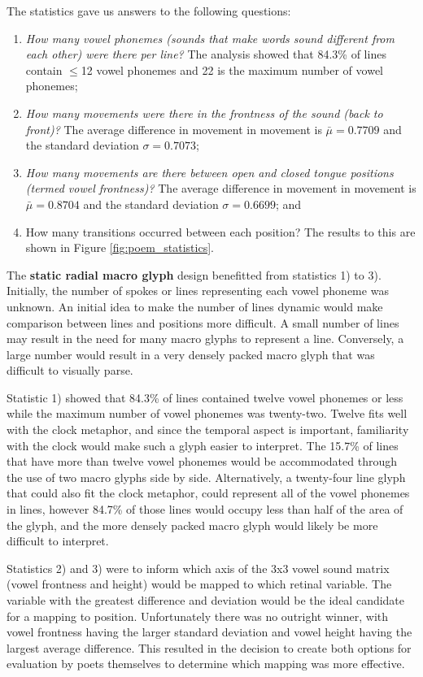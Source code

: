 The statistics gave us answers to the following questions: 
\begin{enumerate}
\item \emph{How many vowel phonemes (sounds that make words sound different from each other) were there per line?} The analysis showed that 84.3\% of lines contain $\leq$12 vowel phonemes and 22 is the maximum number of vowel phonemes;
\item \emph{How many movements were there in the frontness of the sound (back to front)?} The average difference in movement in movement is $\bar\mu=0.7709$ and the standard deviation $\sigma=0.7073$;
\item \emph{How many movements are there between open and closed tongue positions (termed vowel frontness)?} The average difference in movement in movement is $\bar\mu=0.8704$ and the standard deviation $\sigma=0.6699$; and 
\item How many transitions occurred between each position? The results to this are shown in Figure \ref{fig:poem_statistics}.
\end{enumerate}

The \textbf{static radial macro glyph} design benefitted from statistics 1) to 3). 
Initially, the number of spokes or lines representing each vowel phoneme was unknown. 
An initial idea to make the number of lines dynamic would make comparison between lines and positions more difficult. 
A small number of lines may result in the need for many macro glyphs to represent a line.
Conversely, a large number would result in a very densely packed macro glyph that was difficult to visually parse.

Statistic 1) showed that 84.3\% of lines contained twelve vowel phonemes or less while the maximum number of vowel phonemes was twenty-two. 
Twelve fits well with the clock metaphor, and since the temporal aspect is important, familiarity with the clock would make such a glyph easier to interpret. 
The 15.7\% of lines that have more than twelve vowel phonemes would be accommodated through the use of two macro glyphs side by side. 
Alternatively, a twenty-four line glyph that could also fit the clock metaphor, could represent all of the vowel phonemes in lines, however 84.7\% of those lines would occupy less than half of the area of the glyph, and the more densely packed macro glyph would likely be more difficult to interpret.

Statistics 2) and 3) were to inform which axis of the 3x3 vowel sound matrix (vowel frontness and height) would be mapped to which retinal variable. 
The variable with the greatest difference and deviation would be the ideal candidate for a mapping to position. 
Unfortunately there was no outright winner, with vowel frontness having the larger standard deviation and vowel height having the largest average difference.
This resulted in the decision to create both options for evaluation by poets themselves to determine which mapping was more effective.
 
